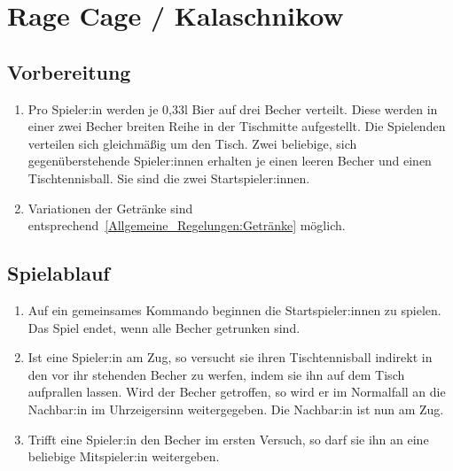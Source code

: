 \chapter{Rage Cage / Kalaschnikow}
\section{Vorbereitung}
\begin{enumerate}[label={(\arabic*)}]
    \item
    Pro Spieler:in werden je 0,33l Bier auf drei Becher verteilt.
    Diese werden in einer zwei Becher breiten Reihe in der Tischmitte aufgestellt.
    Die Spielenden verteilen sich gleichmäßig um den Tisch.
    Zwei beliebige, sich gegenüberstehende Spieler:innen erhalten je einen leeren Becher und einen Tischtennisball.
    Sie sind die zwei Startspieler:innen.

    \item
    Variationen der Getränke sind entsprechend~\ref{Allgemeine_Regelungen:Getränke} möglich.
\end{enumerate}

\section{Spielablauf}
\begin{enumerate}[label={(\arabic*)}]
    \item
    Auf ein gemeinsames Kommando beginnen die Startspieler:innen zu spielen.
    Das Spiel endet, wenn alle Becher getrunken sind.

    \item
    Ist eine Spieler:in am Zug, so versucht sie ihren Tischtennisball indirekt in den vor ihr stehenden Becher zu werfen, indem sie ihn auf dem Tisch aufprallen lassen.
    Wird der Becher getroffen, so wird er im Normalfall an die Nachbar:in im Uhrzeigersinn weitergegeben.
    Die Nachbar:in ist nun am Zug.

    \item
    Trifft eine Spieler:in den Becher im ersten Versuch, so darf sie ihn an eine beliebige Mitspieler:in weitergeben.
\end{enumerate}

